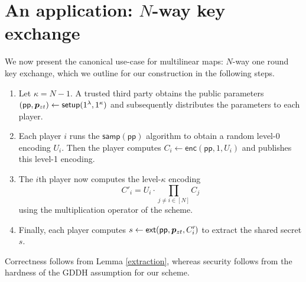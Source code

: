 \section{An application: $N$-way key exchange}

We now present the canonical use-case for multilinear maps: $N$-way one round key exchange, which we outline for our construction in the following steps.

\begin{enumerate}
\item  Let $\kappa = N - 1$. A trusted third party obtains the public parameters $(\mathsf{pp}, \bm{p}_{zt}) \leftarrow \mathsf{setup}(1^\lambda, 1^\kappa)$  and subsequently distributes the parameters to each player.

\item Each player $i$ runs the $\mathsf{samp}(\mathsf{pp})$ algorithm to obtain a random level-0 encoding $U_i$.  Then the player computes $C_i \leftarrow \mathsf{enc}(\mathsf{pp}, 1, U_i)$ and publishes this level-1 encoding.

\item The $i$th player now computes the level-$\kappa$ encoding $$C'_i = U_i \cdot \prod_{j\not= i \in [N]} C_j$$ using the multiplication operator of the scheme.

\item  Finally, each player computes $s \leftarrow \mathsf{ext}(\mathsf{pp}, \bm{p}_{zt}, C'_i)$ to extract the shared secret $s$.
\end{enumerate}

Correctness follows from Lemma \ref{extraction}, whereas security follows from the hardness of the GDDH assumption for our scheme.
